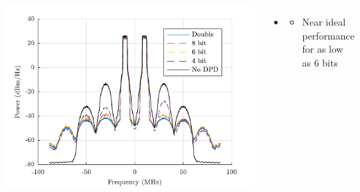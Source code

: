 \documentclass[25pt]{tikzposter} %
\begin{document}
\begin{columns}
{\begin{tikzfigure}[]
			\label{fig:fig1}
			\centering
			\includegraphics[width=12in]{../TEX/FullBandPSD.pdf}
		\end{tikzfigure}
		\begin{itemize}
			\item[] {} %
			\begin{itemize}
				\item {Near ideal performance for as low as 6 bits}
			\end{itemize}
		\end{itemize}	
	}







\end{columns}
\end{document}
